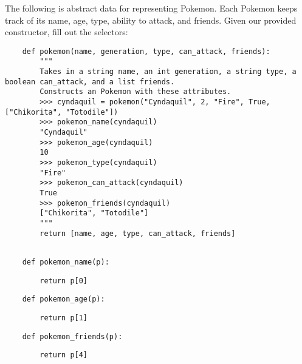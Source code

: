 \begin{blocksection}
    \question The following is abstract data for representing Pokemon.
    Each Pokemon keeps track of its name, age, type, ability to attack, and friends. Given
    our provided constructor, fill out the selectors:
    
    \begin{lstlisting}
    def pokemon(name, generation, type, can_attack, friends):
        """
        Takes in a string name, an int generation, a string type, a boolean can_attack, and a list friends.
        Constructs an Pokemon with these attributes.
        >>> cyndaquil = pokemon("Cyndaquil", 2, "Fire", True, ["Chikorita", "Totodile"])
        >>> pokemon_name(cyndaquil)
        "Cyndaquil"
        >>> pokemon_age(cyndaquil)
        10
        >>> pokemon_type(cyndaquil)
        "Fire"
        >>> pokemon_can_attack(cyndaquil)
        True
        >>> pokemon_friends(cyndaquil)
        ["Chikorita", "Totodile"]
        """
        return [name, age, type, can_attack, friends]
    
    \end{lstlisting}
    
    \end{blocksection}
    \begin{blocksection}
    
    \begin{lstlisting}
    def pokemon_name(p):
    \end{lstlisting}
    \begin{solution}[1in]
    \begin{lstlisting}
        return p[0]
    \end{lstlisting}
    \end{solution}
    \end{blocksection}
    \begin{blocksection}
    
    \begin{lstlisting}
    def pokemon_age(p):
    \end{lstlisting}
    \begin{solution}[1in]
    \begin{lstlisting}
        return p[1]
    \end{lstlisting}
    \end{solution}
    \end{blocksection}
    \begin{blocksection}
    
    \begin{lstlisting}
    def pokemon_friends(p):
    \end{lstlisting}
    \begin{solution}[1in]
    \begin{lstlisting}
        return p[4]
    \end{lstlisting}
    \end{solution}
    \end{blocksection}
    
